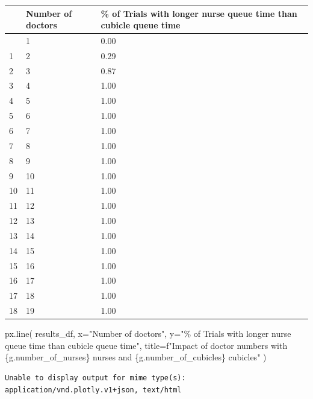 \documentclass[
  letterpaper,
  DIV=11,
  numbers=noendperiod]{scrreprt}
\newenvironment{Shaded}{\begin{snugshade}}{\end{snugshade}}
\newcommand{\NormalTok}[1]{\textcolor[rgb]{0.00,0.23,0.31}{#1}}
\newcommand{\OperatorTok}[1]{\textcolor[rgb]{0.37,0.37,0.37}{#1}}
\newcommand{\SpecialCharTok}[1]{\textcolor[rgb]{0.37,0.37,0.37}{#1}}
\newcommand{\SpecialStringTok}[1]{\textcolor[rgb]{0.13,0.47,0.30}{#1}}
\newcommand{\StringTok}[1]{\textcolor[rgb]{0.13,0.47,0.30}{#1}}
\begin{document}
\begin{longtable}[]{@{}lll@{}}
\toprule\noalign{}
& Number of doctors & \% of Trials with longer nurse queue time than
cubicle queue time \\
\midrule\noalign{}
\endhead
\bottomrule\noalign{}
\endlastfoot
0 & 1 & 0.00 \\
1 & 2 & 0.29 \\
2 & 3 & 0.87 \\
3 & 4 & 1.00 \\
4 & 5 & 1.00 \\
5 & 6 & 1.00 \\
6 & 7 & 1.00 \\
7 & 8 & 1.00 \\
8 & 9 & 1.00 \\
9 & 10 & 1.00 \\
10 & 11 & 1.00 \\
11 & 12 & 1.00 \\
12 & 13 & 1.00 \\
13 & 14 & 1.00 \\
14 & 15 & 1.00 \\
15 & 16 & 1.00 \\
16 & 17 & 1.00 \\
17 & 18 & 1.00 \\
18 & 19 & 1.00 \\
\end{longtable}

\begin{Shaded}
\begin{Highlighting}[]
\NormalTok{px.line(}
\NormalTok{  results\_df,}
\NormalTok{  x}\OperatorTok{=}\StringTok{"Number of doctors"}\NormalTok{,}
\NormalTok{  y}\OperatorTok{=}\StringTok{"}\SpecialCharTok{\% o}\StringTok{f Trials with longer nurse queue time than cubicle queue time"}\NormalTok{,}
\NormalTok{  title}\OperatorTok{=}\SpecialStringTok{f"Impact of doctor numbers with }\SpecialCharTok{\{}\NormalTok{g}\SpecialCharTok{.}\NormalTok{number\_of\_nurses}\SpecialCharTok{\}}\SpecialStringTok{ nurses and }\SpecialCharTok{\{}\NormalTok{g}\SpecialCharTok{.}\NormalTok{number\_of\_cubicles}\SpecialCharTok{\}}\SpecialStringTok{ cubicles"}
\NormalTok{  )}
\end{Highlighting}
\end{Shaded}

\begin{verbatim}
Unable to display output for mime type(s): application/vnd.plotly.v1+json, text/html
\end{verbatim}
\end{document}
